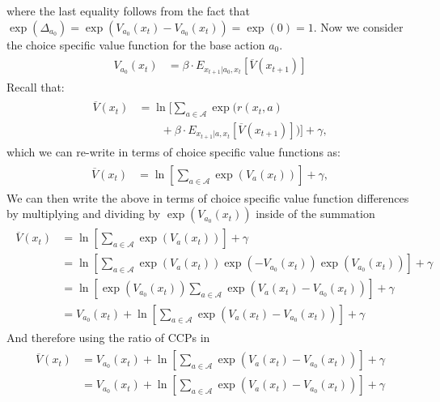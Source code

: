 \documentclass{article}
\begin{document}
where the last equality follows from the fact that $\exp(\Delta_{a_0})=\exp(V_{a_0}(x_t)-V_{a_0}(x_t))=\exp(0)=1$.
Now we consider the choice specific value function for the base action $a_0$. 
\begin{align}
\begin{split}
V_{a_0}(x_t) &= \beta  \cdot E_{x_{t+1}|a_0,x_t} \left[ \overline{V}(x_{t+1}) \right] 
\end{split}
\end{align}
Recall that:
\begin{align} 
\begin{split}
\overline{V}(x_t) &=\ln\bigg[\sum_{a\in\mathcal{A}} \exp\big(r(x_t,a)
\\&\qquad+\beta \cdot E_{x_{t+1}|a,x_t} \left[ \overline{V}(x_{t+1}) \right] \big)\bigg]  +\gamma,
\end{split}
\end{align}
which we can re-write in terms of choice specific value functions as:
\begin{align} 
\begin{split}
\overline{V}(x_t) &=\ln\left[\sum_{a\in\mathcal{A}} \exp\left(V_a(x_t) \right)\right]+\gamma,
\end{split}
\end{align}
We can then write the above in terms of choice specific value function differences by multiplying and dividing by $\exp(V_{a_0}(x_t))$ inside of the summation
\begin{align}
\begin{split}
\overline{V}(x_t) &=\ln\left[\sum_{a\in\mathcal{A}} \exp\left(V_a(x_t) \right)\right]+\gamma
\\&=\ln\left[\sum_{a\in\mathcal{A}} \exp(V_a(x_t))\exp(-V_{a_0}(x_t))\exp(V_{a_0}(x_t))\right]+\gamma
\\&=\ln\left[\exp(V_{a_0}(x_t))\sum_{a\in\mathcal{A}} \exp(V_a(x_t)-V_{a_0}(x_t))\right]+\gamma\\
&=V_{a_0}(x_t)+\ln\left[\sum_{a\in\mathcal{A}} \exp(V_a(x_t)-V_{a_0}(x_t))\right]+\gamma
\end{split}
\end{align}
And therefore using the ratio of CCPs in 
\begin{align} 
\begin{split}
\overline{V}(x_t) &=V_{a_0}(x_t)+\ln\left[\sum_{a\in\mathcal{A}} \exp(V_a(x_t)-V_{a_0}(x_t))\right]+\gamma\\
&=V_{a_0}(x_t)+\ln\left[\sum_{a\in\mathcal{A}} \exp(V_a(x_t)-V_{a_0}(x_t))\right]+\gamma\\
\end{split}
\end{align}
\end{document}
